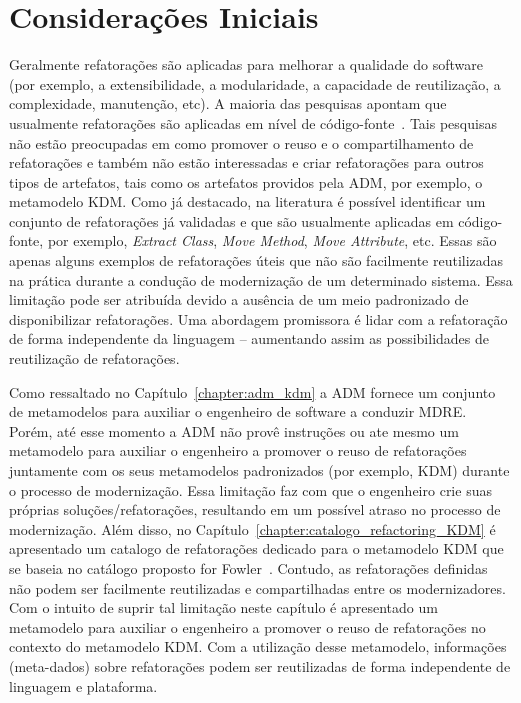 \section{Considerações Iniciais}\label{sec:consideracoes_iniciais}
Geralmente refatorações são aplicadas para melhorar a qualidade do software (por exemplo, a extensibilidade, a modularidade, a capacidade de reutilização, a complexidade, manutenção, etc). 
A maioria das pesquisas apontam que usualmente refatorações são aplicadas em nível de código-fonte~\cite{Fowler1999, Demeyer1, Demeyer2, Opdy92b}. Tais pesquisas não estão preocupadas em como promover o reuso e o compartilhamento de refatorações e também não estão interessadas e criar refatorações para outros tipos de artefatos, tais como os artefatos providos pela ADM, por exemplo, o metamodelo KDM. 
%
Como já destacado, na literatura é possível identificar um conjunto de refatorações já validadas e que são usualmente aplicadas em código-fonte, por exemplo, \textit{Extract Class}, \textit{Move Method}, \textit{Move Attribute}, etc. Essas são apenas alguns exemplos de refatorações úteis que não são facilmente reutilizadas na prática durante a condução de modernização de um determinado sistema. Essa limitação pode ser atribuída devido a ausência de um meio padronizado de disponibilizar refatorações. 
Uma abordagem promissora é lidar com a refatoração de forma independente da linguagem – aumentando assim as possibilidades de reutilização de refatorações.

Como ressaltado no Capítulo~\ref{chapter:adm_kdm} a ADM fornece um conjunto de metamodelos para auxiliar o engenheiro de software a conduzir MDRE. 
Porém, até esse momento a ADM não provê instruções ou ate mesmo um metamodelo para auxiliar o engenheiro a promover o reuso de refatorações juntamente com os seus metamodelos padronizados (por exemplo, KDM) durante o processo de modernização. 
Essa limitação faz com que o engenheiro crie suas próprias soluções/refatorações, resultando em um possível atraso no processo de modernização. 
Além disso, no Capítulo~\ref{chapter:catalogo_refactoring_KDM} é apresentado um catalogo de refatorações dedicado para o metamodelo KDM que se baseia no catálogo proposto for Fowler~\cite{Fowler1999}. Contudo, as refatorações definidas não podem ser facilmente reutilizadas e compartilhadas entre os modernizadores. 
Com o intuito de suprir tal limitação neste capítulo é apresentado um metamodelo para auxiliar o engenheiro a promover o reuso de refatorações no contexto do metamodelo KDM. Com a utilização desse metamodelo, informações (meta-dados) sobre refatorações podem ser reutilizadas de forma independente de linguagem e plataforma. 

